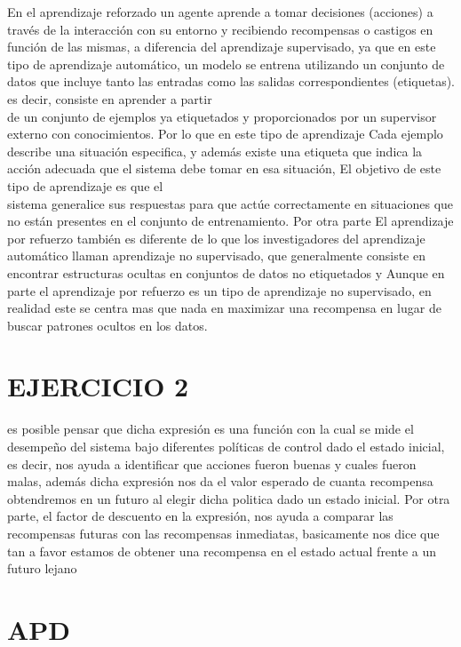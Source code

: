 \documentclass[
  letterpaper,
  DIV=11,
  numbers=noendperiod]{scrreprt}
\begin{document}
En el aprendizaje reforzado un agente aprende a tomar decisiones
(acciones) a través de la interacción con su entorno y recibiendo
recompensas o castigos en función de las mismas, a diferencia del
aprendizaje supervisado, ya que en este tipo de aprendizaje automático,
un modelo se entrena utilizando un conjunto de datos que incluye tanto
las entradas como las salidas correspondientes (etiquetas). es decir,
consiste en aprender a partir\\
de un conjunto de ejemplos ya etiquetados y proporcionados por un
supervisor externo con conocimientos. Por lo que en este tipo de
aprendizaje Cada ejemplo describe una situación especifica, y además
existe una etiqueta que indica la acción adecuada que el sistema debe
tomar en esa situación, El objetivo de este tipo de aprendizaje es que
el\\
sistema generalice sus respuestas para que actúe correctamente en
situaciones que no están presentes en el conjunto de entrenamiento. Por
otra parte El aprendizaje por refuerzo también es diferente de lo que
los investigadores del aprendizaje automático llaman aprendizaje no
supervisado, que generalmente consiste en\\
encontrar estructuras ocultas en conjuntos de datos no etiquetados y
Aunque en parte el aprendizaje por refuerzo es un tipo de aprendizaje no
supervisado, en realidad este se centra mas que nada en maximizar una
recompensa en lugar de buscar patrones ocultos en los datos.

\section{EJERCICIO 2}\label{ejercicio-2}

es posible pensar que dicha expresión es una función con la cual se mide
el desempeño del sistema bajo diferentes políticas de control dado el
estado inicial, es decir, nos ayuda a identificar que acciones fueron
buenas y cuales fueron malas, además dicha expresión nos da el valor
esperado de cuanta recompensa obtendremos en un futuro al elegir dicha
politica dado un estado inicial. Por otra parte, el factor de descuento
en la expresión, nos ayuda a comparar las recompensas futuras con las
recompensas inmediatas, basicamente nos dice que tan a favor estamos de
obtener una recompensa en el estado actual frente a un futuro lejano

\section{APD}\label{apd}
\end{document}
